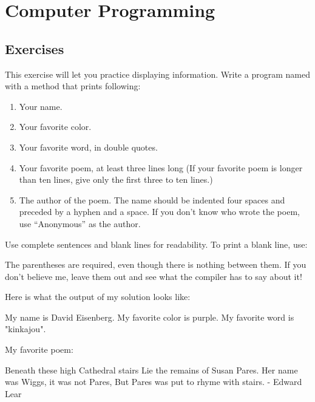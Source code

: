 \chapter{Computer Programming}

\section{Exercises}

\begin{exercise}
This exercise will let you practice displaying information.  Write a program named  with a  method that prints following:

\begin{enumerate}
\item Your name.
\item Your favorite color.
\item Your favorite word, in double quotes.
\item Your favorite poem, at least three lines long (If your favorite poem is longer than ten lines, give only the first three to ten lines.)
\item The author of the poem. The name should be indented four spaces and preceded by a hyphen and a space. If you don't know who wrote the poem, use ``Anonymous'' as the author.
\end{enumerate}

Use complete sentences and blank lines for readability.  To print a blank line, use:


The parentheses are required, even though there is nothing between them. If you don't believe me, leave them out and see what the compiler has to say about it!

Here is what the output of my solution looks like:

\begin{stdout}
My name is David Eisenberg.
My favorite color is purple.
My favorite word is "kinkajou".

My favorite poem:

Beneath these high Cathedral stairs
Lie the remains of Susan Pares.
Her name was Wiggs, it was not Pares,
But Pares was put to rhyme with stairs.
    - Edward Lear
\end{stdout}
\end{exercise}
